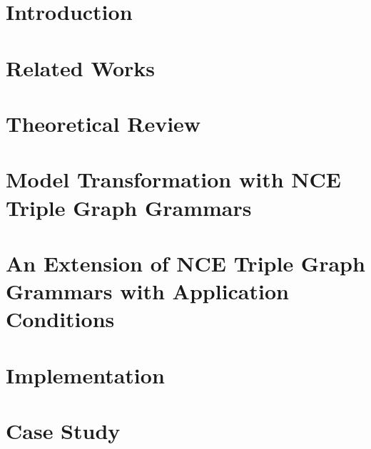 \documentclass[side,12pt,oz,a4,fancybox,fancyheadings,fleqnb,openany]{book}
\begin{document}
\parindent=0in
\parskip=5pt
\setcounter{secnumdepth}{5}
\setcounter{tocdepth}{2}



\cleardoublepage


\cleardoublepage

\setcounter{page}{5}




{
\tableofcontents
\listoffigures
\listoftables
}

\chapter{Introduction}
\label{ch:Introduction}


\chapter{Related Works}
\label{ch:RelatedWorks}


\chapter{Theoretical Review}
\label{ch:TheoreticalReview}


\chapter{Model Transformation with NCE Triple Graph Grammars}
\label{ch:ModelTransformation}


\chapter{An Extension of NCE Triple Graph Grammars with Application Conditions}
\label{ch:PacExtension}


\chapter{Implementation}
\label{ch:Implementation}


\chapter{Case Study}
\label{ch:CaseStudy}

\end{document}
